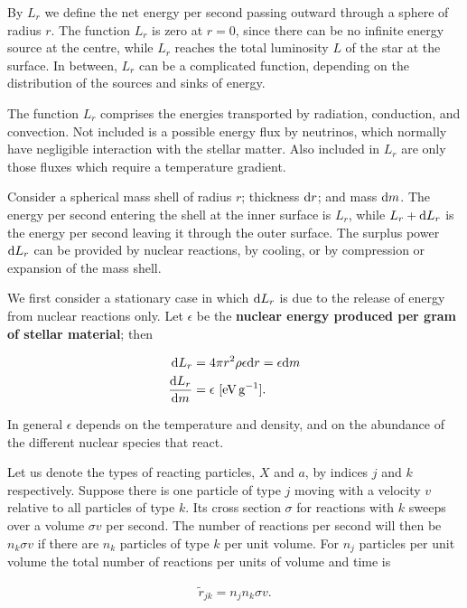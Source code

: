 \documentclass[a4paper,10pt]{article}
\begin{document}
{\noindent}By $L_r$ we define the net energy per second passing outward through a sphere of radius $r$. The function $L_r$ is zero at $r=0$, since there can be no infinite energy source at the centre, while $L_r$ reaches the total luminosity $L$ of the star at the surface. In between, $L_r$ can be a complicated function, depending on the distribution of the sources and sinks of energy.

{\noindent}The function $L_r$ comprises the energies transported by radiation, conduction, and convection. Not included is a possible energy flux by neutrinos, which normally have negligible interaction with the stellar matter. Also included in $L_r$ are only those fluxes which require a temperature gradient.

{\noindent}Consider a spherical mass shell of radius $r$; thickness ${\rm d}r$; and mass ${\rm d}m$. The energy per second entering the shell at the inner surface is $L_r$, while $L_r+{\rm d}L_r$ is the energy per second leaving it through the outer surface. The surplus power ${\rm d}L_r$ can be provided by nuclear reactions, by cooling, or by compression or expansion of the mass shell.

{\noindent}We first consider a stationary case in which ${\rm d}L_r$ is due to the release of energy from nuclear reactions only. Let $\epsilon$ be the \textbf{nuclear energy produced per gram of stellar material}; then

\begin{align*}
    {\rm d}L_r &= 4\pi r^2\rho\epsilon{\rm d}r = \epsilon {\rm d}m \\
    \frac{{\rm d}L_r}{{\rm d}m} &= \epsilon ~ [{\rm eV\,g^{-1}}].
\end{align*}

{\noindent}In general $\epsilon$ depends on the temperature and density, and on the abundance of the different nuclear species that react.

{\noindent}Let us denote the types of reacting particles, $X$ and $a$, by indices $j$ and $k$ respectively. Suppose there is one particle of type $j$ moving with a velocity $v$ relative to all particles of type $k$. Its cross section $\sigma$ for reactions with $k$ sweeps over a volume $\sigma v$ per second. The number of reactions per second will then be $n_k \sigma v$ if there are $n_k$ particles of type $k$ per unit volume. For $n_j$ particles per unit volume the total number of reactions per units of volume and time is

\begin{align*}
    \tilde{r}_{jk} = n_jn_k\sigma v.
\end{align*}
\end{document}
